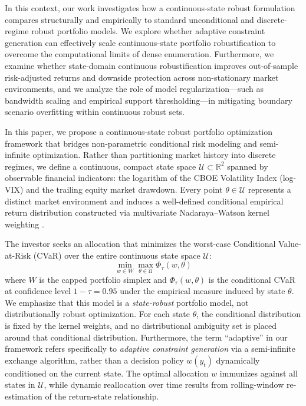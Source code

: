 \documentclass[smallextended]{svjour3}
\begin{document}
In this context, our work investigates how a continuous-state robust formulation compares structurally and empirically to standard unconditional and discrete-regime robust portfolio models. We explore whether adaptive constraint generation can effectively scale continuous-state portfolio robustification to overcome the computational limits of dense enumeration. Furthermore, we examine whether state-domain continuous robustification improves out-of-sample risk-adjusted returns and downside protection across non-stationary market environments, and we analyze the role of model regularization---such as bandwidth scaling and empirical support thresholding---in mitigating boundary scenario overfitting within continuous robust sets.

In this paper, we propose a continuous-state robust portfolio optimization framework that bridges non-parametric conditional risk modeling and semi-infinite optimization. Rather than partitioning market history into discrete regimes, we define a continuous, compact state space $\mathcal{U} \subset \mathbb{R}^2$ spanned by observable financial indicators: the logarithm of the CBOE Volatility Index (log-VIX) \cite{cboe2026vix} and the trailing equity market drawdown. Every point $\theta \in \mathcal{U}$ represents a distinct market environment and induces a well-defined conditional empirical return distribution constructed via multivariate Nadaraya--Watson kernel weighting \cite{nadaraya1964estimating, watson1964smooth}.

The investor seeks an allocation that minimizes the worst-case Conditional Value-at-Risk (CVaR) over the entire continuous state space $\mathcal{U}$:
\begin{equation}
    \min_{w \in W} \max_{\theta \in \mathcal{U}} \Phi_\tau(w, \theta)
\end{equation}
where $W$ is the capped portfolio simplex and $\Phi_\tau(w, \theta)$ is the conditional CVaR at confidence level $1-\tau = 0.95$ under the empirical measure induced by state $\theta$. We emphasize that this model is a \emph{state-robust} portfolio model, not distributionally robust optimization. For each state $\theta$, the conditional distribution is fixed by the kernel weights, and no distributional ambiguity set is placed around that conditional distribution. Furthermore, the term ``adaptive'' in our framework refers specifically to \emph{adaptive constraint generation} via a semi-infinite exchange algorithm, rather than a decision policy $w(y_t)$ dynamically conditioned on the current state. The optimal allocation $w$ immunizes against all states in $\mathcal{U}$, while dynamic reallocation over time results from rolling-window re-estimation of the return-state relationship.
\end{document}
